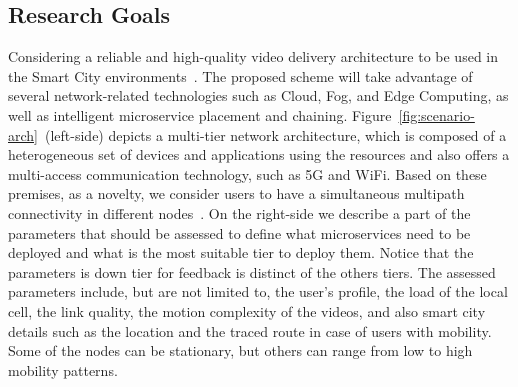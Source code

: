 
\subsection*{Research Goals}
\label{sec:research-goals}

Considering a reliable and high-quality video delivery architecture to be used in the Smart City environments~\cite{gamaUCC2019}. The proposed scheme will take advantage of several network-related technologies such as Cloud, Fog, and Edge Computing, as well as intelligent microservice placement and chaining. Figure~\ref{fig:scenario-arch}~(left-side) depicts a multi-tier network architecture, which is composed of a heterogeneous set of devices and applications using the resources and also offers a multi-access communication technology, such as 5G and WiFi. Based on these premises, as a novelty, we consider users to have a simultaneous multipath connectivity in different nodes~\cite{poliakovPHD2018}.
On the right-side we describe a part of the parameters that should be assessed to define what microservices need to be deployed and what is the most suitable tier to deploy them. Notice that the parameters is down tier for feedback is distinct of the others tiers.
The assessed parameters include, but are not limited to, the user's profile, the load of the local cell, the link quality, the motion complexity of the videos, and also smart city details such as the location and the traced route in case of users with mobility. Some of the nodes can be stationary, but others can range from low to high mobility patterns. %

